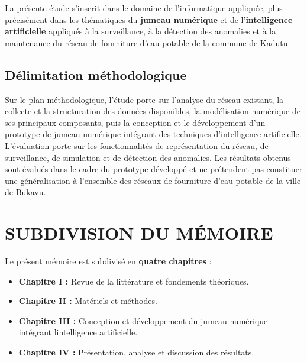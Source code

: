 La présente étude s'inscrit dans le domaine de l'informatique appliquée,
plus précisément dans les thématiques du \textbf{jumeau numérique} et
de l'\textbf{intelligence artificielle} appliqués à la surveillance,
à la détection des anomalies et à la maintenance du réseau de
fourniture d'eau potable de la commune de Kadutu.

\subsection{Délimitation méthodologique}
\label{delimitation-methodologique}

Sur le plan méthodologique, l'étude porte sur l'analyse du réseau
existant, la collecte et la structuration des données disponibles, la
modélisation numérique de ses principaux composants, puis la conception
et le développement d'un prototype de jumeau numérique intégrant des
techniques d'intelligence artificielle. L'évaluation porte sur les
fonctionnalités de représentation du réseau, de surveillance, de
simulation et de détection des anomalies. Les résultats obtenus sont
évalués dans le cadre du prototype développé et ne prétendent pas
constituer une généralisation à l'ensemble des réseaux de fourniture
d'eau potable de la ville de Bukavu.

\section{SUBDIVISION DU MÉMOIRE}\label{subdivision-du-muxe9moire}

Le présent mémoire est subdivisé en \textbf{quatre chapitres} :

\begin{itemize}
\item
  \textbf{Chapitre I :} Revue de la littérature et fondements
  théoriques.
\item 
  \textbf{Chapitre II :} Matériels et méthodes.
\item
  \textbf{Chapitre III :} Conception et développement du jumeau
  numérique intégrant l\textquotesingle intelligence artificielle.
\item
  \textbf{Chapitre IV :} Présentation, analyse et discussion des
  résultats.
\end{itemize}

\clearpage
